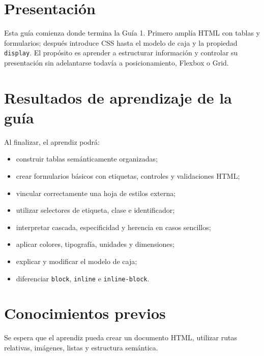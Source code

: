 \documentclass[11pt]{article}
\begin{document}
\thispagestyle{firstpage}
\GuideHeader
{}

\section{Presentación}
Esta guía comienza donde termina la Guía 1. Primero amplía HTML con tablas y formularios; después introduce CSS hasta el modelo de caja y la propiedad \texttt{display}. El propósito es aprender a estructurar información y controlar su presentación sin adelantarse todavía a posicionamiento, Flexbox o Grid.

\section*{Resultados de aprendizaje de la guía}
Al finalizar, el aprendiz podrá:
\begin{itemize}
    \item construir tablas semánticamente organizadas;
    \item crear formularios básicos con etiquetas, controles y validaciones HTML;
    \item vincular correctamente una hoja de estilos externa;
    \item utilizar selectores de etiqueta, clase e identificador;
    \item interpretar cascada, especificidad y herencia en casos sencillos;
    \item aplicar colores, tipografía, unidades y dimensiones;
    \item explicar y modificar el modelo de caja;
    \item diferenciar \texttt{block}, \texttt{inline} e \texttt{inline-block}.
\end{itemize}

\section*{Conocimientos previos}
Se espera que el aprendiz pueda crear un documento HTML, utilizar rutas relativas, imágenes, listas y estructura semántica.

\end{document}
